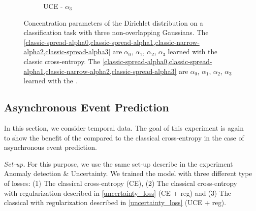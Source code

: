 \begin{figure}[H]
\begin{subfigure}{0.24\textwidth}
        \caption{UCE - $\alpha_3$}
        \label{new-spread-alpha3}
    \end{subfigure}
    \caption{Concentration parameters of the Dirichlet distribution on a classification task with three non-overlapping Gaussians. The \cref{classic-spread-alpha0,classic-spread-alpha1,classic-narrow-alpha2,classic-spread-alpha3} are $\alpha_0$, $\alpha_1$, $\alpha_2$, $\alpha_3$ learned with the classic cross-entropy. The \cref{classic-spread-alpha0,classic-spread-alpha1,classic-narrow-alpha2,classic-spread-alpha3} are $\alpha_0$, $\alpha_1$, $\alpha_2$, $\alpha_3$ learned with the \UncertaintyLoss.}
    \label{fig:alpha_classification2}
\end{figure}

\subsection{Asynchronous Event Prediction}

In this section, we consider temporal data. The goal of this experiment is again to show the benefit of the \UncertaintyLoss compared to the classical cross-entropy in the case of asynchronous event prediction.

\textit{Set-up.} For this purpose, we use the same set-up describe in the experiment Anomaly detection \& Uncertainty. We trained the model \DirModel with three different type of losses: (1) The classical cross-entropy (CE), (2) The classical cross-entropy with regularization described in \cref{uncertainty_loss} (CE + reg) and (3) The classical \UncertaintyLoss with regularization described in \cref{uncertainty_loss} (UCE + reg).

